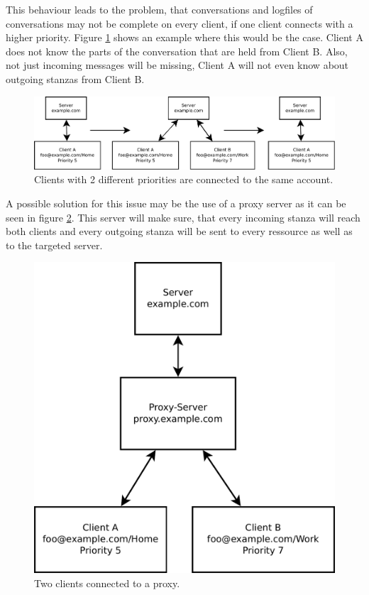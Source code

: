 \documentclass[a4paper,10pt,numbers=noendperiod]{scrartcl}
\begin{document}
This behaviour leads to the problem, that conversations and logfiles of conversations may not be complete on every client, if one client connects with a higher priority. Figure \ref{fig:2clients} shows an example where this would be the case. Client A does not know the parts of the conversation that are held from Client B. Also, not just incoming messages will be missing, Client A will not even know about outgoing stanzas from Client B. 
\begin{figure}[h!]
	\begin{center}
		\includegraphics[scale=0.6]{figures/diagram1.pdf}
	\end{center}
	\caption{Clients with 2 different priorities are connected to the same account.}
	\label{fig:2clients}
\end{figure}


A possible solution for this issue may be the use of a proxy server as it can be seen in figure \ref{fig:2clientsproxy}. This server will make sure, that every incoming stanza will reach both clients and every outgoing stanza will be sent to every ressource as well as to the targeted server.

\begin{figure}[h!]
	\begin{center}
		\includegraphics[scale=0.4]{figures/diagram3.pdf}
	\end{center}
	\caption{Two clients connected to a proxy.}
	\label{fig:2clientsproxy}
\end{figure}
\newpage
\end{document}
